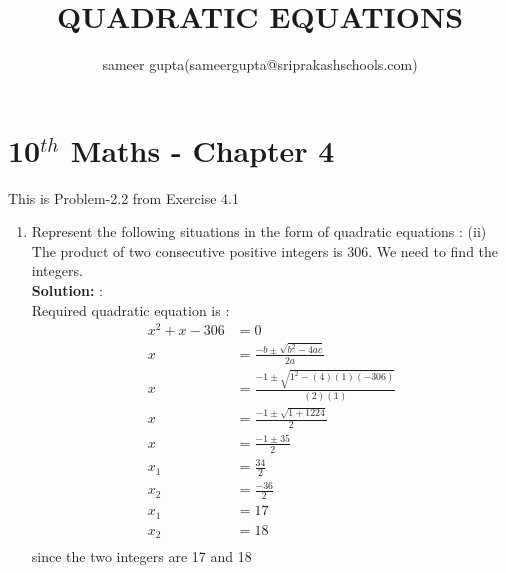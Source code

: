 \documentclass[10pt]{article}
\title{QUADRATIC EQUATIONS}
\author{sameer gupta(sameergupta@sriprakashschools.com)}
\newcommand{\solution}{\noindent \textbf{Solution: }}
\begin{document}
    \maketitle
    \section*{10$^{th}$ Maths - Chapter 4}
    This is Problem-2.2 from Exercise 4.1
    \begin{enumerate}
    \item Represent the following situations in the form of quadratic equations :
(ii) The product of two consecutive positive integers is 306. We need to find the
integers.\\
\solution:\\Required quadratic equation is :
\begin{align}
x^2+x-306&= 0\\
x&=\frac{-b\pm\sqrt{b^2-4ac}}{2a}\\
x&=\frac{-1\pm\sqrt{1^2-(4)(1)(-306)}}{(2)(1)}\\
x&=\frac{-1\pm\sqrt{1+1224}}{2}\\
x&=\frac{-1\pm 35}{2}\\
x_1&=\frac{34}{2}\\
x_2&=\frac{-36}{2}\\
x_1&=17\\
x_2&=18\\
\end{align}
since the two integers are 17 and 18
\end{enumerate}
\end{document}
